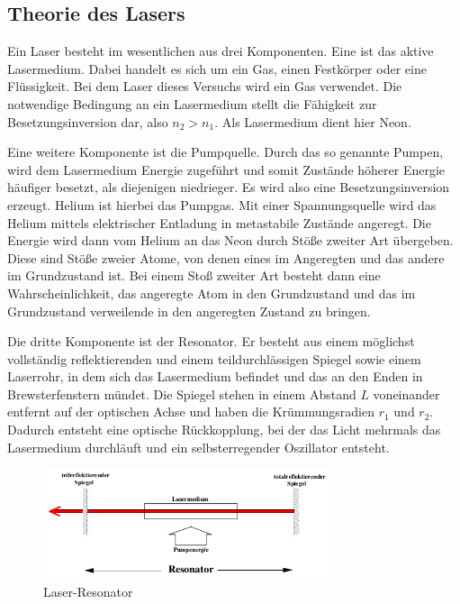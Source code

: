 \subsection{Theorie des Lasers}
Ein Laser besteht im wesentlichen aus drei Komponenten. Eine ist das aktive Lasermedium. Dabei handelt es sich um ein Gas, einen Festkörper oder eine Flüssigkeit. Bei dem Laser dieses Versuchs wird ein Gas verwendet. Die notwendige Bedingung an ein Lasermedium stellt die Fähigkeit zur Besetzungsinversion dar, also \(n_2>n_1\). Als Lasermedium dient hier Neon.

\noindent Eine weitere Komponente ist die Pumpquelle. Durch das so genannte Pumpen, wird dem Lasermedium Energie zugeführt und somit Zustände höherer Energie häufiger besetzt, als diejenigen niedrieger. Es wird also eine Besetzungsinversion erzeugt. Helium ist hierbei das Pumpgas. Mit einer Spannungsquelle wird das Helium mittels elektrischer Entladung in metastabile Zustände angeregt. Die Energie wird dann vom Helium an das Neon durch Stöße zweiter Art übergeben. Diese sind Stöße zweier Atome, von denen eines im Angeregten und das andere im Grundzustand ist. Bei einem Stoß zweiter Art besteht dann eine Wahrscheinlichkeit, das angeregte Atom in den Grundzustand und das im Grundzustand verweilende in den angeregten Zustand zu bringen. 

\noindent Die dritte Komponente ist der Resonator. Er besteht aus einem möglichst vollständig reflektierenden und einem teildurchlässigen Spiegel sowie einem Laserrohr, in dem sich das Lasermedium befindet und das an den Enden in Brewsterfenstern mündet. Die Spiegel stehen in einem Abstand \(L\)  voneinander entfernt auf der optischen Achse und haben die Krümmungsradien \(r_1\) und \(r_2\). Dadurch entsteht eine optische Rückkopplung, bei der das Licht mehrmals das Lasermedium durchläuft und ein selbsterregender Oszillator entsteht. 

\begin{figure}
	\centering
	\includegraphics[width=0.75\textwidth]{img/resonator}
	\caption{Laser-Resonator \cite{V61}}
	\label{fig:resonator}
\end{figure}

